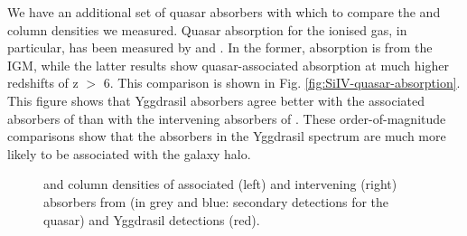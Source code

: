 We have an additional set of quasar absorbers with which to compare the  and  column densities we measured. Quasar absorption for the ionised gas, in particular, has been measured by \citet{songaila1998} and \citet{dodorico2013}. In the former, absorption is from the IGM, while the latter results show quasar-associated absorption at much higher redshifts of z $>$ 6. This comparison is shown in Fig. \ref{fig:SiIV-quasar-absorption}. This figure shows that Yggdrasil absorbers agree better with the associated absorbers of \citet{dodorico2013} than with the intervening absorbers of \citet{songaila1998}. These order-of-magnitude comparisons show that the absorbers in the Yggdrasil spectrum are much more likely to be associated with the galaxy halo.

\begin{figure} 
\captionsetup[subfigure]{labelformat=empty}
\hspace{1pt}
\centering
{}
\centering
{}
\caption[$N_\ion{C}{IV}$ and $N_\ion{N}{V}$ column densities of host galaxy and quasar absorbers]{ and  column densities of associated (left) and intervening (right) absorbers from \citet{fechner2009} (in grey and blue: secondary detections for the quasar) and Yggdrasil detections (red).}
 \label{fig:NV-quasar-absorption}
\end{figure}

